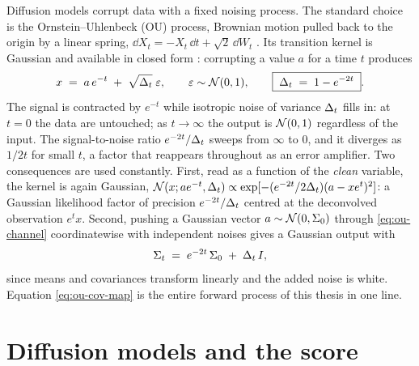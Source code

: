 Diffusion models corrupt data with a fixed noising process. The standard
choice \citep{song2021scorebased} is the
Ornstein--Uhlenbeck (OU) process, Brownian motion pulled back to the
origin by a linear spring,
$\dd X_t = -X_t\,\dd t + \sqrt{2}\,\dd W_t$
\citep{uhlenbeck1930theory}. Its transition kernel is Gaussian and
available in closed form \citep{gardiner2009stochastic}: corrupting a
value $a$ for a time $t$ produces
\begin{equation}
  x \;=\; a\, e^{-t} \;+\; \sqrt{\Delta_t}\;\varepsilon,
  \qquad \varepsilon \sim \mathcal{N}(0, 1),
  \qquad
  \boxed{\;\Delta_t \;=\; 1 - e^{-2t}\;} .
  \label{eq:ou-channel}
\end{equation}
The signal is contracted by $e^{-t}$ while isotropic noise of variance
$\Delta_t$ fills in: at $t = 0$ the data are untouched; as $t \to \infty$
the output is $\mathcal{N}(0,1)$ regardless of the input. The signal-to-noise ratio
$e^{-2t}/\Delta_t$ sweeps from $\infty$ to $0$, and it diverges as $1/2t$
for small $t$, a factor that reappears throughout as an error amplifier.
Two consequences are used constantly. First, read as a function of the
\emph{clean} variable, the kernel is again Gaussian,
$\mathcal{N}(x; a e^{-t}, \Delta_t) \propto
\exp[-(e^{-2t}/2\Delta_t)(a - x e^{t})^2]$: a Gaussian likelihood factor of
precision $e^{-2t}/\Delta_t$ centred at the deconvolved observation
$e^t x$. Second, pushing a Gaussian vector
$a \sim \mathcal{N}(0, \Sigma_0)$ through \eqref{eq:ou-channel} coordinatewise with
independent noises gives a Gaussian output with
\begin{equation}
  \Sigma_t \;=\; e^{-2t}\, \Sigma_0 \;+\; \Delta_t\, I ,
  \label{eq:ou-cov-map}
\end{equation}
since means and covariances transform linearly and the added noise is
white. Equation \eqref{eq:ou-cov-map} is the entire forward process of this
thesis in one line.

\section{Diffusion models and the score}\label{sec:diffusion-idea}
\label{sec:reversal}

